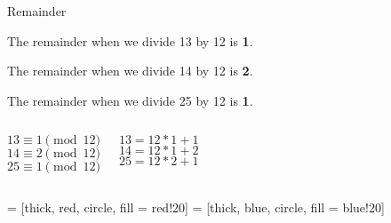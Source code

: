 \documentclass{beamer}
\begin{document}
\begin{frame}{Remainder}
    \begin{overlayarea}{\textwidth}{10cm}
     {\begin{block}{} The \alert {remainder} when we divide 13 by 12 is \textbf 1. \end{block}}
     { \begin{block}{} The \alert {remainder} when we divide 14 by 12 is \textbf 2. \end{block}}
     {\begin{block}{}The \alert {remainder} when we divide 25 by 12 is \textbf 1.\end{block}}
        \begin{columns}
            \newline 
            \begin{exampleblock}
                {$$ 13 \equiv 1 \pmod{12} $$}
                 {$$ 14 \equiv 2 \pmod{12} $$}
                 {$$ 25 \equiv 1 \pmod{12} $$}
            \end{exampleblock}
            \newline 
            \begin{exampleblock}
                 {$$ 13 = 12 * 1 + 1 $$}
                 {$$ 14 = 12 * 1 + 2 $$}
                 {$$ 25 = 12 * 2 + 1 $$}
            \end{exampleblock}
        \end{columns}
    \end{overlayarea}
\end{frame}

 = [thick, red, circle, fill = red!20]
 = [thick, blue, circle, fill = blue!20]
\end{document}
